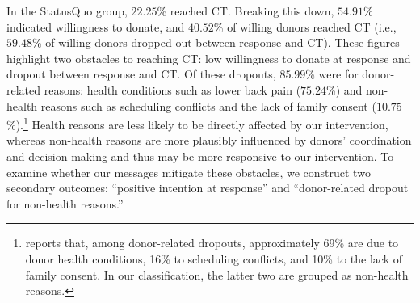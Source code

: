 \documentclass[12pt, a4paper]{article}
\begin{document}
In the StatusQuo group, \(22.25\)\% reached CT. Breaking this down, \(54.91\)\% indicated willingness to donate, and \(40.52\)\% of willing donors reached CT (i.e., \(59.48\)\% of willing donors dropped out between response and CT). These figures highlight two obstacles to reaching CT: low willingness to donate at response and dropout between response and CT. Of these dropouts, \(85.99\)\% were for donor-related reasons: health conditions such as lower back pain (\(75.24\)\%) and non-health reasons such as scheduling conflicts and the lack of family consent (\(10.75\)\%).\footnote{\citet{Hirakawa2018} reports that, among donor-related dropouts, approximately 69\% are due to donor health conditions, 16\% to scheduling conflicts, and 10\% to the lack of family consent. In our classification, the latter two are grouped as non-health reasons.} Health reasons are less likely to be directly affected by our intervention, whereas non-health reasons are more plausibly influenced by donors' coordination and decision-making and thus may be more responsive to our intervention. To examine whether our messages mitigate these obstacles, we construct two secondary outcomes: ``positive intention at response'' and ``donor-related dropout for non-health reasons.''
\end{document}
